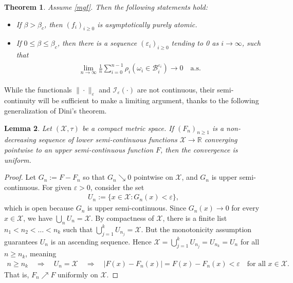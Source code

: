 \documentclass[11pt,reqno]{amsart}
\numberwithin{equation}{section}
\newtheorem{thm}{Theorem}[section]
\newtheorem{lemma}[thm]{Lemma}
\theoremstyle{definition}
\begin{document}
\begin{thm} \label{total_mass}
Assume \eqref{mgf}.
Then the following statements hold:
\begin{itemize}
\item[(a)] If $\beta > \beta_c$, then $(f_i)_{i \geq 0}$ is asymptotically purely atomic.
\item[(b)] If $0 \leq \beta \leq \beta_c$, then there is a sequence $({\varepsilon}_i)_{i \geq 0}$ tending to 0 as $i \to \infty$, such that
{\begin{align} \begin{split} {
\lim_{n \to \infty} \frac{1}{n} \sum_{i = 0}^{n-1} \rho_{i}(\omega_i \in {\mathcal{B}}_i^{{\varepsilon}_i}) \to 0 \quad \mathrm{a.s.}\label{noVSD_claim}
} \end{split} \end{align}}
\end{itemize}
\end{thm}

While the functionals $\|\cdot\|_{\varepsilon}$ and ${{\boldsymbol {\mathcal{I}}}}_{\varepsilon}(\cdot)$ are not continuous, their semi-continuity will be sufficient to make a limiting argument, thanks to the following generalization of Dini's theorem.

\begin{lemma} \label{dini}
Let $({\mathcal{X}},\tau)$ be a compact metric space.
If $(F_n)_{n \geq 1}$ is a non-decreasing sequence of lower semi-continuous functions ${\mathcal{X}} \to {\mathbb{R}}$ converging pointwise to an upper semi-continuous function $F$, then the convergence is uniform.
\end{lemma}

\begin{proof}
Let $G_n := F - F_n$ so that $G_n \searrow 0$ pointwise on ${\mathcal{X}}$, and $G_n$ is upper semi-continuous.
For given ${\varepsilon} > 0$, consider the set
{\begin{align*} {
U_n := \{x \in {\mathcal{X}} : G_n(x) < {\varepsilon}\},
} \end{align*}}
which is open because $G_n$ is upper semi-continuous.
Since $G_n(x) \to 0$ for every $x \in {\mathcal{X}}$, we have $\bigcup_n U_n = {\mathcal{X}}$.
By compactness of ${\mathcal{X}}$, there is a finite list $n_1 < n_2 < \dots < n_k$ such that
$\bigcup_{j = 1}^k U_{n_j} = {\mathcal{X}}$.
But the monotonicity assumption guarantees $U_n$ is an ascending sequence.
Hence ${\mathcal{X}} = \bigcup_{j = 1}^k U_{n_j} = U_{n_k} = U_n$ for all $n \geq n_k$, meaning
{\begin{align*} {
n \geq n_k \quad \Rightarrow \quad
U_n = {\mathcal{X}} \quad \Rightarrow \quad
|F(x) - F_n(x)| = F(x) - F_n(x) < {\varepsilon} \quad \text{for all $x \in {\mathcal{X}}$.}
} \end{align*}}
That is, $F_n \nearrow F$ uniformly on ${\mathcal{X}}$.
\end{proof}
\end{document}
